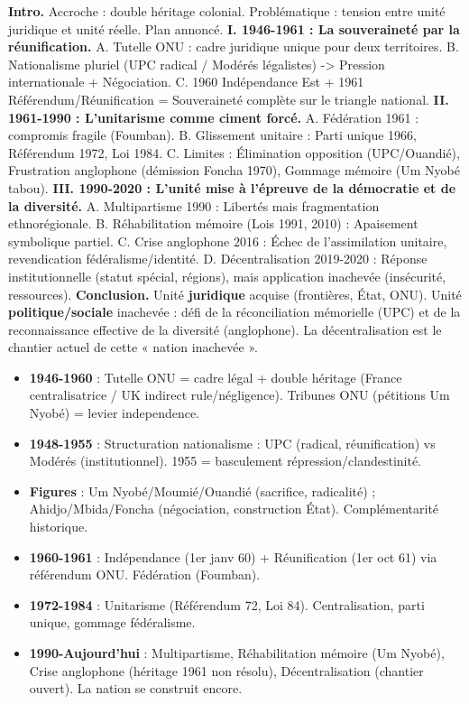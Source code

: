 \documentclass[11pt]{article}
\begin{document}
\begin{corrige}
\textbf{Intro.} Accroche : double héritage colonial. Problématique : tension entre unité juridique et unité réelle. Plan annoncé.
\textbf{I. 1946-1961 : La souveraineté par la réunification.}
A. Tutelle ONU : cadre juridique unique pour deux territoires. B. Nationalisme pluriel (UPC radical / Modérés légalistes) -> Pression internationale + Négociation. C. 1960 Indépendance Est + 1961 Référendum/Réunification = Souveraineté complète sur le triangle national.
\textbf{II. 1961-1990 : L'unitarisme comme ciment forcé.}
A. Fédération 1961 : compromis fragile (Foumban). B. Glissement unitaire : Parti unique 1966, Référendum 1972, Loi 1984. C. Limites : Élimination opposition (UPC/Ouandié), Frustration anglophone (démission Foncha 1970), Gommage mémoire (Um Nyobé tabou).
\textbf{III. 1990-2020 : L'unité mise à l'épreuve de la démocratie et de la diversité.}
A. Multipartisme 1990 : Libertés mais fragmentation ethnorégionale. B. Réhabilitation mémoire (Lois 1991, 2010) : Apaisement symbolique partiel. C. Crise anglophone 2016 : Échec de l'assimilation unitaire, revendication fédéralisme/identité. D. Décentralisation 2019-2020 : Réponse institutionnelle (statut spécial, régions), mais application inachevée (insécurité, ressources).
\textbf{Conclusion.} Unité \textbf{juridique} acquise (frontières, État, ONU). Unité \textbf{politique/sociale} inachevée : défi de la réconciliation mémorielle (UPC) et de la reconnaissance effective de la diversité (anglophone). La décentralisation est le chantier actuel de cette « nation inachevée ».
\end{corrige}

\begin{aretenir}
\begin{itemize}
\item \textbf{1946-1960} : Tutelle ONU = cadre légal + double héritage (France centralisatrice / UK indirect rule/négligence). Tribunes ONU (pétitions Um Nyobé) = levier independence.
\item \textbf{1948-1955} : Structuration nationalisme : UPC (radical, réunification) vs Modérés (institutionnel). 1955 = basculement répression/clandestinité.
\item \textbf{Figures} : Um Nyobé/Moumié/Ouandié (sacrifice, radicalité) ; Ahidjo/Mbida/Foncha (négociation, construction État). Complémentarité historique.
\item \textbf{1960-1961} : Indépendance (1er janv 60) + Réunification (1er oct 61) via référendum ONU. Fédération (Foumban).
\item \textbf{1972-1984} : Unitarisme (Référendum 72, Loi 84). Centralisation, parti unique, gommage fédéralisme.
\item \textbf{1990-Aujourd'hui} : Multipartisme, Réhabilitation mémoire (Um Nyobé), Crise anglophone (héritage 1961 non résolu), Décentralisation (chantier ouvert). La nation se construit encore.
\end{itemize}
\end{aretenir}
\end{document}
